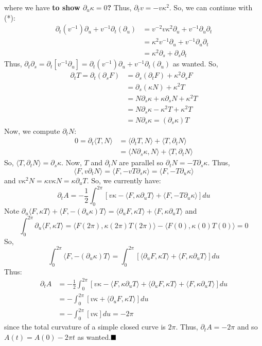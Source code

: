 \documentclass{article}
\begin{document}
where we have \textbf{to show $\partial_u \kappa = 0$?} Thus, $\partial_t v = -v\kappa^2$. So, we can continue with (*):
\begin{align*}
	\partial_t(v^{-1})\partial_u + v^{-1}\partial_t(\partial_u) &= v^{-2}v\kappa^2 \partial_u + v^{-1}\partial_u\partial_t \\
		&= \kappa^2 v^{-1} \partial_u  + v^{-1}\partial_u\partial_t \\
		&= \kappa^2\partial_s + \partial_s\partial_t
\end{align*}
Thus, $\partial_t\partial_s = \partial_t[v^{-1}\partial_u] = \partial_t(v^{-1})\partial_u + v^{-1}\partial_t(\partial_u)$ as wanted. So,
\begin{align*}
	\partial_t T = \partial_t(\partial_s F) &= \partial_s(\partial_t F) + \kappa^2 \partial_s F \\
		&= \partial_s(\kappa N) + \kappa^2 T \\
		&= N\partial_s \kappa + \kappa\partial_s N + \kappa^2 T \\
		&= N\partial_s \kappa -  \kappa^2 T + \kappa^2 T \\
		&= N\partial_s \kappa = (\partial_s \kappa)T
\end{align*}
Now, we compute $\partial_t N$:
\begin{align*}
	0 = \partial_t \langle T, N\rangle &= \langle \partial_t T, N\rangle + \langle T, \partial_t N\rangle \\
		&= \langle N\partial_s\kappa, N\rangle + \langle T,\partial_t N\rangle
\end{align*}
So, $\langle T, \partial_t N\rangle = \partial_s \kappa$. Now, $T$ and $\partial_t N$ are parallel so $\partial_t N = -T \partial_s \kappa$. Thus,
\[ \langle F, v\partial_t N\rangle = \langle F, -vT\partial_s \kappa\rangle = \langle F, -T\partial_u \kappa\rangle \]
and $v\kappa^2 N = \kappa v\kappa N = \kappa\partial_u T$. So, we currently have:
\[ \partial_t A = -\frac{1}{2} \int_0^{2\pi} [v\kappa - \langle F, \kappa\partial_u T\rangle + \langle F, -T \partial_u \kappa\rangle] du \]
Note $\partial_u \langle F,\kappa T\rangle + \langle F, -(\partial_u \kappa)T\rangle = \langle \partial_u F, \kappa T\rangle + \langle F, \kappa \partial_u T\rangle$ and
 \[ \int_0^{2\pi} \partial_u \langle F, \kappa T\rangle = \langle F(2\pi), \kappa(2\pi)T(2\pi) \rangle - \langle F(0), \kappa(0)T(0) \rangle = 0 \]
So,
\[ \int_0^{2\pi} \langle F,-(\partial_u \kappa)T\rangle = \int_0^{2\pi} [\langle \partial_u F, \kappa T\rangle + \langle F, \kappa \partial_u T\rangle]du \]
Thus:
\begin{align*}
	\partial_t A &= -\frac{1}{2} \int_0^{2\pi} [v\kappa - \langle F, \kappa\partial_u T\rangle + \langle \partial_u F, \kappa T\rangle + \langle F, 
        \kappa \partial_u T\rangle] du \\
		&= -\int_0^{2\pi} [v\kappa + \langle \partial_u F, \kappa T\rangle] du \\
		&= -\int_0^{2\pi} [v\kappa] du = -2\pi
\end{align*}
since the total curvature of a simple closed curve is $2\pi$. Thus, $\partial_t A = -2\pi$ and so $A(t) = A(0) -2\pi t$ as wanted.$\hfill\blacksquare$
\newpage
\end{document}
